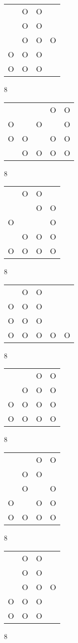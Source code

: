 \begin{tabular}{|m{0.2cm}m{0.2cm}m{0.2cm}m{0.2cm}|}\hline
 &O&O& \\
 &O&O& \\
 &O&O&O\\
O&O&O& \\
O&O&O& \\
\hline\end{tabular}8
\begin{tabular}{|m{0.2cm}m{0.2cm}m{0.2cm}m{0.2cm}m{0.2cm}|}\hline
 & & &O&O\\
O& &O& &O\\
O&O& &O&O\\
 &O&O&O&O\\
\hline\end{tabular}8
\begin{tabular}{|m{0.2cm}m{0.2cm}m{0.2cm}m{0.2cm}|}\hline
 &O&O& \\
 & &O&O\\
O& & &O\\
 &O&O&O\\
O&O&O&O\\
\hline\end{tabular}8
\begin{tabular}{|m{0.2cm}m{0.2cm}m{0.2cm}m{0.2cm}m{0.2cm}|}\hline
 &O&O& & \\
O&O&O& & \\
O&O&O& & \\
O&O&O&O&O\\
\hline\end{tabular}8
\begin{tabular}{|m{0.2cm}m{0.2cm}m{0.2cm}m{0.2cm}|}\hline
 & &O&O\\
 &O&O&O\\
O&O&O&O\\
O&O&O&O\\
\hline\end{tabular}8
\begin{tabular}{|m{0.2cm}m{0.2cm}m{0.2cm}m{0.2cm}|}\hline
 & &O&O\\
 &O&O& \\
 &O& &O\\
O& &O&O\\
O&O&O&O\\
\hline\end{tabular}8
\begin{tabular}{|m{0.2cm}m{0.2cm}m{0.2cm}m{0.2cm}|}\hline
 &O&O& \\
 &O&O& \\
 &O&O&O\\
O&O&O& \\
O&O&O& \\
\hline\end{tabular}8

